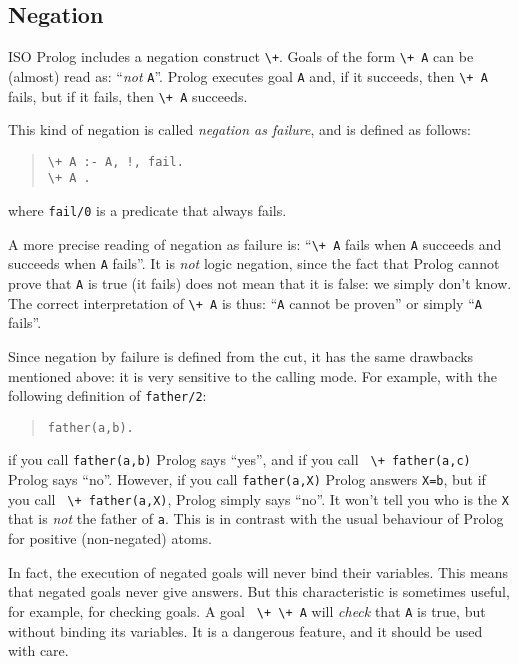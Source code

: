 
\subsection{Negation}

ISO Prolog includes a negation construct \verb-\+-. Goals of the form
\verb-\+ A- can be (almost) read as: ``{\em not} \verb+A+''. Prolog
executes goal \verb+A+ and, if it succeeds, then \verb-\+ A- fails,
but if it fails, then \verb-\+ A- succeeds.

This kind of negation is called {\em negation as failure}, and is
defined as follows:
\begin{quote}
\begin{verbatim}
\+ A :- A, !, fail.
\+ A .
\end{verbatim}
\end{quote}
%
where \verb+fail/0+ is a predicate that always fails.

A more precise reading of negation as failure is: ``\verb-\+ A-
fails when \verb+A+ succeeds and succeeds when \verb+A+ fails''.
It is {\em not} logic negation, since the fact that Prolog cannot prove
that \verb+A+ is true (it fails) does not mean that it is false: we
simply don't know. The correct interpretation of \verb-\+ A- is thus:
``\verb+A+ cannot be proven'' or simply ``\verb+A+ fails''.

Since negation by failure is defined from the cut, it has the same
drawbacks mentioned above: it is very sensitive to the calling
mode. For example, with the following definition of \verb+father/2+:
\begin{quote}
\begin{verbatim}
father(a,b).
\end{verbatim}
\end{quote}
%
if you call \verb+father(a,b)+ Prolog says ``yes'', and if you call
\verb- \+ father(a,c)- Prolog says ``no''. However, if you call
\verb+father(a,X)+ Prolog answers \verb+X=b+, but if you call
\verb- \+ father(a,X)-, Prolog simply says ``no''. It won't tell
you who is the \verb+X+ that is {\em not} the father of \verb+a+. This
is in contrast with the usual behaviour of Prolog for positive
(non-negated) atoms.

In fact, the execution of negated goals will never bind their
variables. This means that negated goals never give answers. But this
characteristic is sometimes useful, for example, for checking goals. A goal
\verb- \+ \+ A- will {\em check} that \verb+A+ is true, but without
binding its variables. It is a dangerous feature, and it should
be used with care.

